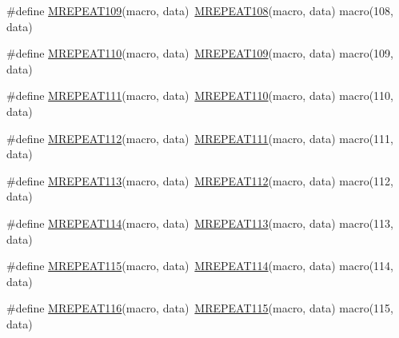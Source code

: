 \begin{DoxyCompactItemize}
\item 
\#define \mbox{\hyperlink{group__group__sam0__utils__mrepeat_ga3756d19974e9584f0e8f0c6e404c8f61}{M\+R\+E\+P\+E\+A\+T109}}(macro,  data)~\mbox{\hyperlink{group__group__sam0__utils__mrepeat_gacfbea84aacb4958d50fc747c7f512dcb}{M\+R\+E\+P\+E\+A\+T108}}(macro, data)   macro(108, data)
\item 
\#define \mbox{\hyperlink{group__group__sam0__utils__mrepeat_ga7ada858a2020e79d348db928bc0b886b}{M\+R\+E\+P\+E\+A\+T110}}(macro,  data)~\mbox{\hyperlink{group__group__sam0__utils__mrepeat_ga3756d19974e9584f0e8f0c6e404c8f61}{M\+R\+E\+P\+E\+A\+T109}}(macro, data)   macro(109, data)
\item 
\#define \mbox{\hyperlink{group__group__sam0__utils__mrepeat_gaa95d8fb6f36efe2095bac8dee72ffb69}{M\+R\+E\+P\+E\+A\+T111}}(macro,  data)~\mbox{\hyperlink{group__group__sam0__utils__mrepeat_ga7ada858a2020e79d348db928bc0b886b}{M\+R\+E\+P\+E\+A\+T110}}(macro, data)   macro(110, data)
\item 
\#define \mbox{\hyperlink{group__group__sam0__utils__mrepeat_ga9e7619019279e0bb7b52e9825bac227d}{M\+R\+E\+P\+E\+A\+T112}}(macro,  data)~\mbox{\hyperlink{group__group__sam0__utils__mrepeat_gaa95d8fb6f36efe2095bac8dee72ffb69}{M\+R\+E\+P\+E\+A\+T111}}(macro, data)   macro(111, data)
\item 
\#define \mbox{\hyperlink{group__group__sam0__utils__mrepeat_ga41f4b4f9d9ce5b392cfa10804e69b163}{M\+R\+E\+P\+E\+A\+T113}}(macro,  data)~\mbox{\hyperlink{group__group__sam0__utils__mrepeat_ga9e7619019279e0bb7b52e9825bac227d}{M\+R\+E\+P\+E\+A\+T112}}(macro, data)   macro(112, data)
\item 
\#define \mbox{\hyperlink{group__group__sam0__utils__mrepeat_gab7df5ef1e6f0f3980e9e94b701ecd4dd}{M\+R\+E\+P\+E\+A\+T114}}(macro,  data)~\mbox{\hyperlink{group__group__sam0__utils__mrepeat_ga41f4b4f9d9ce5b392cfa10804e69b163}{M\+R\+E\+P\+E\+A\+T113}}(macro, data)   macro(113, data)
\item 
\#define \mbox{\hyperlink{group__group__sam0__utils__mrepeat_ga065e40294f3d496aa0d661ef472f7914}{M\+R\+E\+P\+E\+A\+T115}}(macro,  data)~\mbox{\hyperlink{group__group__sam0__utils__mrepeat_gab7df5ef1e6f0f3980e9e94b701ecd4dd}{M\+R\+E\+P\+E\+A\+T114}}(macro, data)   macro(114, data)
\item 
\#define \mbox{\hyperlink{group__group__sam0__utils__mrepeat_gad60209ee8f18b1ecf655a810044966aa}{M\+R\+E\+P\+E\+A\+T116}}(macro,  data)~\mbox{\hyperlink{group__group__sam0__utils__mrepeat_ga065e40294f3d496aa0d661ef472f7914}{M\+R\+E\+P\+E\+A\+T115}}(macro, data)   macro(115, data)

\end{DoxyCompactItemize}
